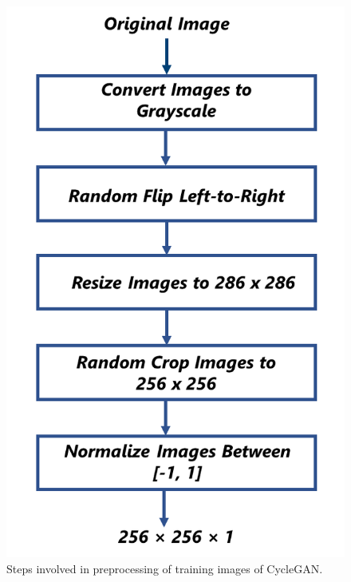 \begin{figure}[H]
        \begin{center}
	    \includegraphics[scale=0.35]{images/Implementation/Preprocessing.png}
	    \caption[Steps involved in preprocessing of training images of \ac{CycleGAN}.]{Steps involved in preprocessing of training images of \ac{CycleGAN}.}
	    \label{fig:Preprocessing}
	    \end{center}
\end{figure}

